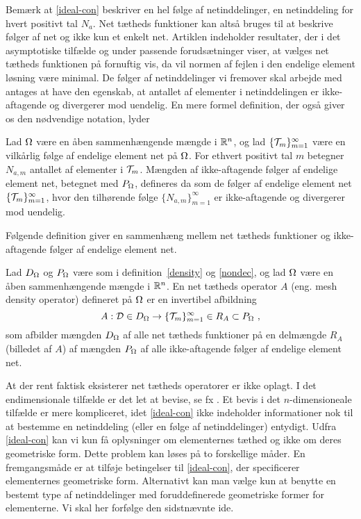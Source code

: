 Bemærk at \eqref{ideal-con} beskriver en hel følge af netinddelinger,
en netinddeling for hvert positivt tal $N_a$. Net tætheds funktioner
kan altså bruges til at beskrive følger af net og ikke kun et enkelt
net. Artiklen \cite{hugger-3} indeholder resultater, der i det
asymptotiske tilfælde og under passende forudsætninger viser, at
vælges net tætheds funktionen på
fornuftig vis, da vil normen af fejlen i den endelige element løsning være
minimal. De følger af netinddelinger vi fremover skal arbejde med
antages at have den egenskab, at antallet af elementer i netinddelingen
er ikke-aftagende og divergerer mod uendelig. En mere formel
definition, der også giver os den nødvendige notation, lyder
\begin{definition}  \label{nondec} 
Lad $\Omega$ være en åben sammenhængende mængde i $\mathbb{R}^n$, og lad
$\{\mathcal T_m\}_{m=1}^{\infty}$ være en vilkårlig følge af endelige element
net på $\Omega$. For ethvert positivt tal $m$ betegner $N_{a,m}$ antallet af
elementer i $\mathcal T_m$. Mængden af ikke-aftagende følger af endelige
element net, betegnet med  $P_{\Omega}$, defineres da som de følger af
endelige element net $\{\mathcal T_m\}_{m=1}^{\infty}$, hvor den tilhørende følge
$\{N_{a,m}\}_{m=1}^{\infty}$ er ikke-aftagende og divergerer mod uendelig.   
\end{definition}

Følgende definition giver en sammenhæng mellem net tætheds
funktioner og ikke-aftagende følger af endelige element net.

\begin{definition}
Lad $D_{\Omega}$ og $P_{\Omega}$ være som i definition~\ref{density} og
\ref{nondec}, og lad $\Omega$ være en åben sammenhængende mængde i
$\mathbb{R}^n$. En net tætheds operator $A$ (eng. mesh density operator) 
defineret på $\Omega$ er en invertibel afbildning
\begin{equation}
  A:{\mathcal{D}}\in D_{\Omega} \rightarrow \{\mathcal T_m\}_{m=1}^{\infty} \in R_A \subset
  P_{\Omega} \ ,
\end{equation}
som afbilder mængden $D_{\Omega}$ af alle net tætheds funktioner på en
delmængde $R_A$ (billedet af $A$) af mængden $P_{\Omega}$ af alle
ikke-aftagende følger af endelige element net.
\end{definition}

At der rent faktisk eksisterer net tætheds operatorer er ikke
oplagt. I det endi\-men\-sio\-na\-le tilfælde er det let at bevise, se fx
\cite{hugger-2}. Et bevis i det $n$-dimensioneale tilfælde er mere
kompliceret, idet \eqref{ideal-con} ikke indeholder informationer nok
til at bestemme en netinddeling (eller en følge af netinddelinger)
entydigt. Udfra \eqref{ideal-con} kan vi kun få oplysninger om
elementernes tæthed og ikke om deres geometriske form. Dette
problem kan løses på to forskellige måder. En fremgangsmåde er at tilføje
betingelser til \eqref{ideal-con}, der specificerer elementernes geometriske
form. Alternativt kan man vælge kun at benytte en bestemt type af
netinddelinger med foruddefinerede geometriske former for
elementerne. Vi skal her forfølge den sidstnævnte ide.

